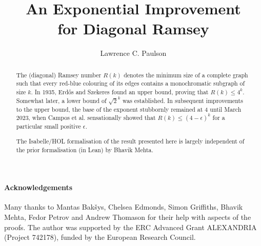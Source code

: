 \documentclass[11pt,a4paper]{article}
\begin{document}
\title{An Exponential Improvement\\ for Diagonal Ramsey}
\author{Lawrence C. Paulson}
\maketitle

\begin{abstract}

The (diagonal) Ramsey number $R(k)$ denotes the minimum size of a complete graph such that every red-blue colouring of its edges contains a monochromatic subgraph of size $k$.
In 1935, Erd\H{o}s and Szekeres found an upper bound, proving that $R(k)\le 4^k$. Somewhat later, a lower bound of $\sqrt{2}^k$ was established.
In subsequent improvements to the upper bound, the base of the exponent stubbornly 
remained at 4 until March 2023, when Campos et al. \cite{campos-exponential-ramsey}
sensationally showed that $R(k)\le (4-\epsilon)^k$ for a particular
small positive $\epsilon$.

The Isabelle/HOL formalisation of the result presented here is largely
independent of the prior formalisation (in Lean) by Bhavik Mehta.
\end{abstract}

\newpage
\tableofcontents

\paragraph*{Acknowledgements}
Many thanks to Mantas Bakšys, Chelsea Edmonds, Simon Griffiths, Bhavik Mehta, Fedor Petrov and Andrew Thomason for their help with aspects of the proofs.
The author was supported by the ERC Advanced Grant ALEXANDRIA (Project 742178), funded by the European Research Council. 

\newpage





\end{document}
